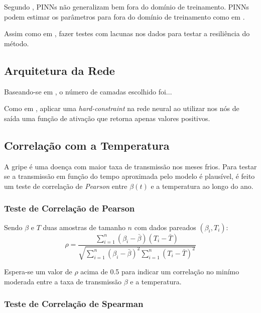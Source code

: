 Segundo \cite{bonfanti-etal:24-generalizacao-pinns}, PINNs não generalizam bem
fora do domínio de treinamento. PINNs podem estimar os parâmetros para fora
do domínio de treinamento como em \cite{millevoi-etal:24-split-join-pinns}.

Assim como em \cite{ghosh-etal:23-subnotificacao}, fazer testes com lacunas
nos dados para testar a resiliência do método.

\subsection{Arquitetura da Rede}

Baseando-se em \cite{shaier-etal:22-dinns}, o número de camadas escolhido foi...

Como em \cite{millevoi-etal:24-split-join-pinns}, aplicar uma 
\textit{hard-constraint} na rede neural ao utilizar nos nós de saída
uma função de ativação que retorna apenas valores positivos.

\subsection{Correlação com a Temperatura}

A gripe é uma doença com maior taxa de transmissão nos meses frios. 
Para testar se a transmissão em função do tempo aproximada pelo modelo é plausível,
é feito um teste de correlação de \textit{Pearson} entre $\beta(t)$ e a temperatura
ao longo do ano.

\subsubsection{Teste de Correlação de Pearson}

Sendo $\beta$ e $T$ duas amostras de tamanho $n$ com dados pareados $(\beta_i, T_i)$:
\begin{equation}\label{correlacao-de-pearson}
\rho = \frac{\sum_{i=1}^{n} (\beta_i - \bar{\beta})(T_i - \bar{T})}{\sqrt{\sum_{i=1}^{n} (\beta_i - \bar{\beta})^2 \sum_{i=1}^{n} (T_i - \bar{T})^2}}
\end{equation}

Espera-se um valor de $\rho$ acima de 0.5 para indicar um correlação no minímo moderada
entre a taxa de transmissão $\beta$ e a temperatura.

\subsubsection{Teste de Correlação de Spearman}

